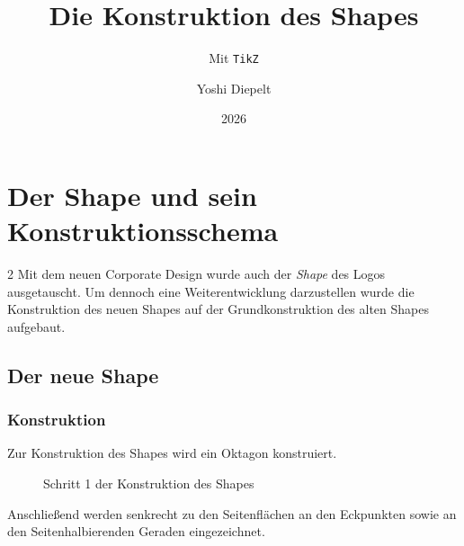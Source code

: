 \documentclass[twoside,fontsize=brochure]{tudcdreprt}
\title{Die Konstruktion des Shapes}
\subtitle{Mit \texttt{TikZ}}
\author{Yoshi Diepelt}
\date{2026}
\begin{document}
\maketitle

\chapter{Der Shape und sein Konstruktionsschema}

\begin{multicols*}{2}
Mit dem neuen Corporate Design wurde auch der \emph{Shape}
des Logos ausgetauscht. Um dennoch eine Weiterentwicklung
darzustellen wurde die Konstruktion des neuen Shapes auf
der Grundkonstruktion des alten Shapes aufgebaut.

\section{Der neue Shape}

\subsection{Konstruktion}

Zur Konstruktion des Shapes wird ein Oktagon konstruiert.

\begin{figure}[H]
  \centering
  \caption{Schritt 1 der Konstruktion des Shapes}
\end{figure}

Anschließend werden senkrecht zu den Seitenflächen an den Eckpunkten
sowie an den Seitenhalbierenden Geraden eingezeichnet.


\end{multicols*}
\end{document}
